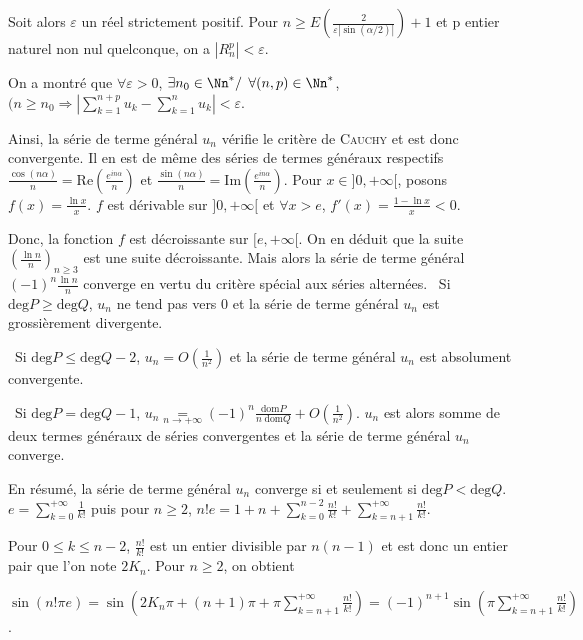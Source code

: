 {{Soit alors $\varepsilon$ un réel strictement positif. Pour $n\geqslant E\left(\frac{2}{\varepsilon|\sin(\alpha/2)|}\right)+ 1$ et p entier naturel non nul quelconque, on a $|R_n^p|<\varepsilon$.

On a montré que $\forall\varepsilon>0$, $\exists n_0\in\Nn^*/$ $\forall(n,p)\in\Nn^*$, $(n\geqslant n_0\Rightarrow\left|\sum_{k=1}^{n+p}u_k-\sum_{k=1}^{n}u_k\right|<\varepsilon$.

Ainsi, la série de terme général $u_n$ vérifie le critère de \textsc{Cauchy} et est donc convergente.
Il en est de même des séries de termes généraux respectifs  $\frac{\cos(n\alpha)}{n}=\text{Re}\left(\frac{e^{in\alpha}}{n}\right)$ et $\frac{\sin(n\alpha)}{n}=\text{Im}\left(\frac{e^{in\alpha}}{n}\right)$.
Pour $x\in]0,+\infty[$, posons $f(x)=\frac{\ln x}{x}$. $f$ est dérivable sur $]0,+\infty[$ et $\forall x>e$, $f'(x)=\frac{1-\ln x}{x}< 0$.

Donc, la fonction $f$ est décroissante sur $[e,+\infty[$. On en déduit que la suite $\left(\frac{\ln n}{n}\right)_{n\geqslant3}$ est une suite décroissante. Mais alors la série de terme général $(-1)^n\frac{\ln n}{n}$ converge en vertu du critère spécial aux séries alternées.
\textbullet~Si $\text{deg}P\geqslant\text{deg}Q$, $u_n$ ne tend pas vers $0$ et la série de terme général $u_n$ est grossièrement divergente.

\textbullet~Si $\text{deg}P\leqslant\text{deg}Q - 2$, $u_n=O\left(\frac{1}{n^2}\right)$ et la série de terme général $u_n$ est absolument convergente.

\textbullet~Si $\text{deg}P =\text{deg}Q - 1$, $u_n\underset{n\rightarrow+\infty}{=}(-1)^n\frac{\text{dom}P}{n\;\text{dom}Q}+O\left(\frac{1}{n^2}\right)$. $u_n$ est alors somme de deux termes généraux de séries convergentes et la série de terme général $u_n$ converge.

En résumé, la série de terme général $u_n$ converge si et seulement si $\text{deg}P <\text{deg}Q$.
$e=\sum_{k=0}^{+\infty}\frac{1}{k!}$  puis pour $n\geqslant2$, $n!e=1+ n+\sum_{k=0}^{n-2}\frac{n!}{k!}+\sum_{k=n+1}^{+\infty}\frac{n!}{k!}$.

Pour $0\leqslant k\leqslant n-2$, $\frac{n!}{k!}$ est un entier divisible par $n(n-1)$ et est donc un entier pair que l'on note $2K_n$. Pour $n\geqslant2$, on obtient

\begin{center}
$\sin(n!\pi e)=\sin\left(2K_n\pi+(n+1)\pi+\pi\sum_{k=n+1}^{+\infty}\frac{n!}{k!}\right)=(-1)^{n+1}\sin\left(\pi\sum_{k=n+1}^{+\infty}\frac{n!}{k!}\right)$.
\end{center}

}}
